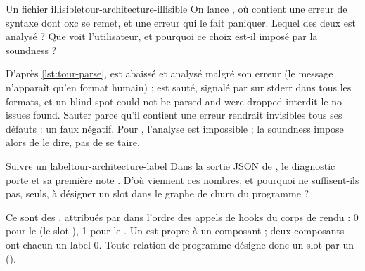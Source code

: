 \begin{exercice}{Un fichier illisible}{tour-architecture-illisible}
On lance , où  contient une erreur de syntaxe dont oxc se remet, et  une erreur qui le fait paniquer. Lequel des deux est analysé ? Que voit l'utilisateur, et pourquoi ce choix est-il imposé par la soundness ?
\end{exercice}
\begin{solution}
D'après \cref{lst:tour-parse},  est abaissé et analysé malgré son erreur (le message  n'apparaît qu'en format humain) ;  est sauté, signalé par \code{[skipped]} sur stderr dans tous les formats, et un blind spot \og could not be parsed and were dropped\fg{} interdit le \og no issues found\fg{}. Sauter  parce qu'il contient une erreur rendrait invisibles tous ses défauts : un faux négatif. Pour , l'analyse est impossible ; la soundness impose alors de le dire, pas de se taire.
\end{solution}

\begin{exercice}{Suivre un label}{tour-architecture-label}
Dans la sortie JSON de , le diagnostic porte  et sa première note . D'où viennent ces nombres, et pourquoi ne suffisent-ils pas, seuls, à désigner un slot dans le graphe de churn du programme ?
\end{exercice}
\begin{solution}
Ce sont des , attribués par  dans l'ordre des appels de hooks du corps de rendu : 0 pour le  (le slot ), 1 pour le . Un  est propre à un composant ; deux composants ont chacun un label 0. Toute relation de programme désigne donc un slot par un  ().
\end{solution}
